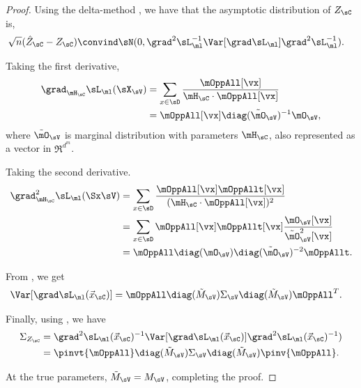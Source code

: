\begin{proof}
  Using the delta-method \cite{vaart98asymptotic}, we have that the
  asymptotic distribution of $Z_\sC$ is,
  \begin{align*}
    \sqrt{n}(\hat Z_{\sC} - Z_{\sC}) &\convind \sN( 0, \grad^2 \sL_\ml^{-1} \Var[\grad \sL_\ml] \grad^2 \sL_\ml^{-1}).
  \end{align*}

Taking the first derivative,
\begin{align}
  \grad_{\mH_\sC} \sL_\ml(\sX_\sV) 
  &= \sum_{x \in \sD} \frac{\mOppAll[\vx]}{\mH_\sC \cdot \mOppAll[\vx]} \nonumber \\ 
  &= \mOppAll[\vx] \diag(\tilde \mO_{\sV})^{-1} \mO_{\sV}, \label{eqn:lhood-grad}
\end{align}
where $\tilde \mO_\sV$ is marginal distribution with parameters $\mH_\sC$, also represented as a vector in $\Re^{d^m}$.

Taking the second derivative.
\begin{align}
  \grad^2_{\mH_\sC} \sL_\ml(\Sx \sV) 
  &= \sum_{x \in \sD} \frac{\mOppAll[\vx] \mOppAllt[\vx]}{(\mH_\sC \cdot \mOppAll[\vx])^2} \nonumber \\
  &= \sum_{x \in \sD}\mOppAll[\vx] \mOppAllt[\vx] \frac{\mO_{\sV}[\vx]}{\tilde \mO_{\sV}^2[\vx]} \nonumber \\
  &= \mOppAll \diag(\mO_{\sV}) \diag(\tilde \mO_{\sV})^{-2} \mOppAllt. \label{eqn:lhood-hess}%
\end{align}



  From , we get
  \begin{align*}
    \Var [\grad \sL_\ml(\vec x_\sC)] &= \mOppAll \diag(\tilde M_\sV) \Sigma_\sV \diag(\tilde M_\sV) \mOppAll^T .
  \end{align*}

  Finally, using , we have
  \begin{align*}
    \Sigma_{Z_\sC} 
      &= \grad^2 \sL_\ml(\vec x_\sC)^{-1} \Var [\grad \sL_\ml(\vec x_\sC)] \grad^2 \sL_\ml(\vec x_\sC)^{-1}) \\
      &= \pinvt{\mOppAll} \diag(\tilde M_\sV) \Sigma_\sV \diag(\tilde M_\sV) \pinv{\mOppAll}.
  \end{align*}

  At the true parameters, $\tilde M_\sV = M_\sV$, completing the proof.
\end{proof}

